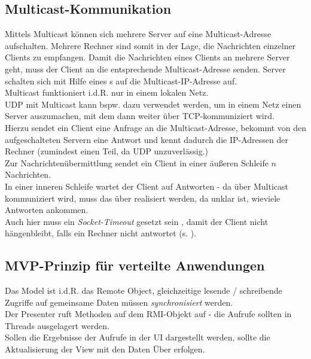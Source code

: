 \subsection*{Multicast-Kommunikation}

Mittels Multicast können sich mehrere Server auf eine Multicast-Adresse aufschalten.
Mehrere Rechner sind somit in der Lage, die Nachrichten einzelner Clients zu empfangen.
Damit die Nachrichten eines Clients an mehrere Server geht, muss der Client an die entsprechende Multicast-Adresse senden.
Server schalten sich mit Hilfe eines s auf die Multicast-IP-Adresse auf.\\

\noindent
Multicast funktioniert i.d.R. nur in einem lokalen Netz.\\

\noindent
UDP mit Multicast kann bspw. dazu verwendet werden, um in einem Netz einen Server auszumachen, mit dem dann weiter über TCP-kommuniziert wird.\\
Hierzu sendet ein Client eine Anfrage an die Multicast-Adresse, bekommt von den aufgeschalteten Servern eine Antwort und kennt dadurch die IP-Adressen der Rechner (zumindest einen Teil, da UDP unzuverlässig.)\\

\noindent
Zur Nachrichtenübermittlung sendet ein Client in einer äußeren Schleife $n$ Nachrichten.\\
In einer inneren Schleife wartet der Client auf Antworten - da über Multicast kommuniziert wird, muss das über  realisiert werden, da unklar ist, wieviele Antworten ankommen.\\
Auch hier muss ein \textit{Socket-Timeout} gesetzt sein , damit der Client nicht hängenbleibt, falls ein Rechner nicht antwortet (s. \cite[279, Listing 5.6]{Oec22}).

\subsection*{MVP-Prinzip für verteilte Anwendungen}

Das Model ist i.d.R. das Remote Object, gleichzeitige lesende / schreibende Zugriffe auf gemeinsame Daten müssen \textit{synchronisiert} werden.\\
Der Presenter ruft Methoden auf dem RMI-Objekt auf - die Aufrufe sollten in Threads ausgelagert werden.\\
Sollen die Ergebnisse der Aufrufe in der UI dargestellt werden, sollte die Aktualisierung der View mit den Daten Über  erfolgen.


